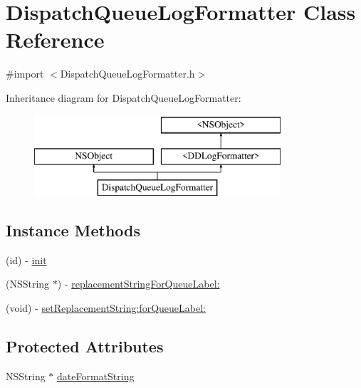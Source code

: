 \hypertarget{interface_dispatch_queue_log_formatter}{\section{Dispatch\-Queue\-Log\-Formatter Class Reference}
\label{interface_dispatch_queue_log_formatter}
}


{\ttfamily \#import $<$Dispatch\-Queue\-Log\-Formatter.\-h$>$}

Inheritance diagram for Dispatch\-Queue\-Log\-Formatter\-:\begin{figure}[H]
\begin{center}
\leavevmode
\includegraphics[height=3.000000cm]{interface_dispatch_queue_log_formatter}
\end{center}
\end{figure}
\subsection*{Instance Methods}
\begin{DoxyCompactItemize}
\item 
(id) -\/ \hyperlink{interface_dispatch_queue_log_formatter_aec0754074cbb898976e8c74a438ee8d4}{init}
\item 
(N\-S\-String $\ast$) -\/ \hyperlink{interface_dispatch_queue_log_formatter_ae4f3fb1b9094e811f66ddbf4bfeb68ff}{replacement\-String\-For\-Queue\-Label\-:}
\item 
(void) -\/ \hyperlink{interface_dispatch_queue_log_formatter_a6e77546201cf0916ce0b61814ab3a0ee}{set\-Replacement\-String\-:for\-Queue\-Label\-:}
\end{DoxyCompactItemize}
\subsection*{Protected Attributes}
\begin{DoxyCompactItemize}
\item 
N\-S\-String $\ast$ \hyperlink{interface_dispatch_queue_log_formatter_ada1bc008577500edefe9429448004da9}{date\-Format\-String}
\end{DoxyCompactItemize}
